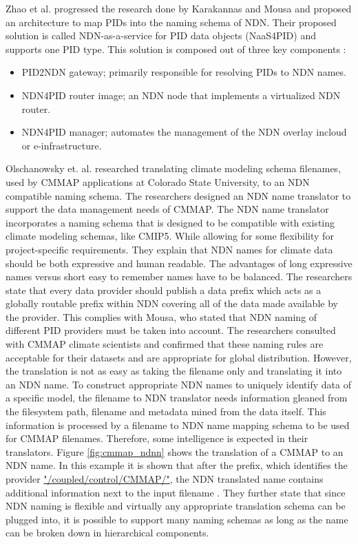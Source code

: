 Zhao et al. progressed the research done by Karakannas \cite{icn-bd} and Mousa \cite{ndn-app-aware} and proposed an architecture to map PIDs into the naming schema of NDN. Their proposed solution is called NDN-as-a-service for PID data objects (NaaS4PID) and supports one PID type. This solution is composed out of three key components \cite{icn-resteam}:
\begin{itemize}
  \item PID2NDN gateway; primarily responsible for resolving PIDs to NDN names.
  \item NDN4PID router image; an NDN node that implements a virtualized NDN router.
  \item NDN4PID manager; automates the management of the NDN overlay in\newline cloud or e-infrastructure.
\end{itemize}

Olschanowsky et. al. researched translating climate modeling schema filenames, used by CMMAP applications at Colorado State University, to an NDN compatible 
naming schema. The researchers designed an NDN name translator to support the data management needs of CMMAP. The NDN name translator incorporates a naming schema that is designed to be compatible with existing climate modeling schemas, like CMIP5. While allowing for some flexibility for project-specific requirements. They explain that NDN names for climate data should be both expressive and human readable. The advantages of long expressive names versus short easy to remember names have to be balanced.
The researchers state that every data provider should publish a data prefix which acts as a globally
routable prefix within NDN covering all of the data made available by the provider. This complies with Mousa, who stated that NDN naming of different PID providers must be taken into account. The researchers consulted with CMMAP climate scientists and confirmed that these naming rules are acceptable for their datasets and are appropriate for global distribution. 
However, the translation is not as easy as taking the filename only and translating it into an NDN name. To construct appropriate NDN names to uniquely identify data of a specific model, the filename to NDN translator needs information gleaned from the filesystem path, filename and metadata mined from the data itself. This information is processed by a filename to NDN name mapping schema to be used for CMMAP filenames. Therefore, some intelligence is expected in their translators.
Figure \ref{fig:cmmap_ndnn} shows the translation of a CMMAP to an NDN name. In this example it is shown that after the prefix, which identifies the provider \url{"/coupled/control/CMMAP/"}, the NDN translated name contains additional information next to the input filename \cite{ndn-clim}.
They further state that since NDN naming is flexible and virtually any appropriate
translation schema can be plugged into, it is possible to support many naming schemas as long as the 
name can be broken down in hierarchical components.

